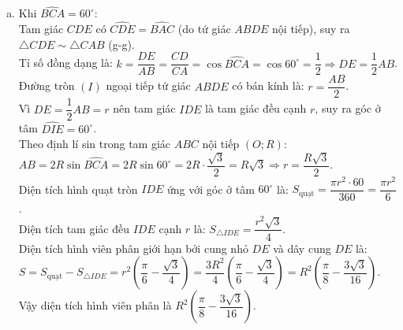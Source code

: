 \begin{bt}
{\begin{enumerate}[a)]
    Tứ giác $AKBH$ có các cặp cạnh đối song song ($AK \parallel BH$ và $BK \parallel AH$) nên $AKBH$ là hình bình hành.\\
    Vì $I$ là trung điểm của đường chéo $AB$ trong hình bình hành $AKBH$ nên $I$ đồng thời là trung điểm của đường chéo $HK$.\\
    Vậy ba điểm $H, I, K$ thẳng hàng.
    \item Khi $\widehat{BCA} = 60^\circ$:\\
    Tam giác $CDE$ có $\widehat{CDE} = \widehat{BAC}$ (do tứ giác $ABDE$ nội tiếp), suy ra $\triangle CDE \sim \triangle CAB$ (g-g).\\
    Tỉ số đồng dạng là:
    $k = \dfrac{DE}{AB} = \dfrac{CD}{CA} = \cos \widehat{BCA} = \cos 60^\circ = \dfrac{1}{2} \Rightarrow DE = \dfrac{1}{2}AB$.\\
    Đường tròn $(I)$ ngoại tiếp tứ giác $ABDE$ có bán kính là:
    $r = \dfrac{AB}{2}$.\\
    Vì $DE = \dfrac{1}{2}AB = r$ nên tam giác $IDE$ là tam giác đều cạnh $r$, suy ra góc ở tâm $\widehat{DIE} = 60^\circ$.\\
    Theo định lí sin trong tam giác $ABC$ nội tiếp $(O; R)$:
    $AB = 2R \sin \widehat{BCA} = 2R \sin 60^\circ = 2R \cdot \dfrac{\sqrt{3}}{2} = R\sqrt{3} \Rightarrow r = \dfrac{R\sqrt{3}}{2}$.\\
    Diện tích hình quạt tròn $IDE$ ứng với góc ở tâm $60^\circ$ là:
    $S_{\text{quạt}} = \dfrac{\pi r^2 \cdot 60}{360} = \dfrac{\pi r^2}{6}$.\\
    Diện tích tam giác đều $IDE$ cạnh $r$ là:
    $S_{\triangle IDE} = \dfrac{r^2\sqrt{3}}{4}$.\\
    Diện tích hình viên phân giới hạn bởi cung nhỏ $DE$ và dây cung $DE$ là:
    $S = S_{\text{quạt}} - S_{\triangle IDE} = r^2\left(\dfrac{\pi}{6} - \dfrac{\sqrt{3}}{4}\right) = \dfrac{3R^2}{4}\left(\dfrac{\pi}{6} - \dfrac{\sqrt{3}}{4}\right) = R^2\left(\dfrac{\pi}{8} - \dfrac{3\sqrt{3}}{16}\right)$.\\
    Vậy diện tích hình viên phân là $R^2\left(\dfrac{\pi}{8} - \dfrac{3\sqrt{3}}{16}\right)$.
\end{enumerate}
}
\end{bt}

